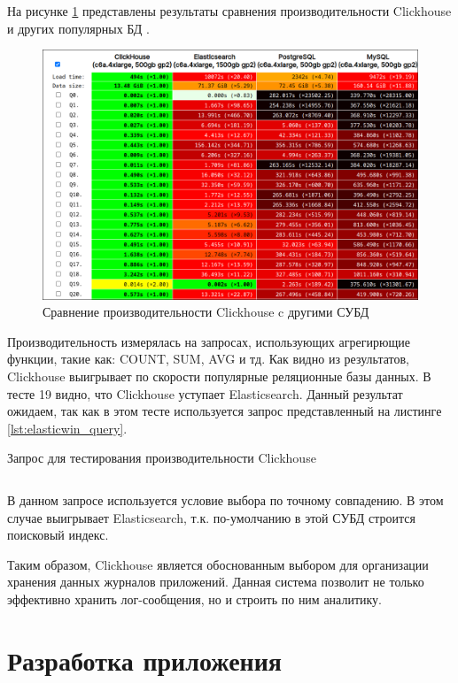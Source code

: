 \documentclass[14pt, russian]{scrartcl}
\begin{document}
На рисунке \ref{fig:clickbench} представлены результаты сравнения производительности Clickhouse и других популярных БД \cite{ClickBench}.


\begin{figure}[H]
	\centering
	\begin{minipage}[t]{.9\textwidth}
		\centering
		\includegraphics[width=.7\textwidth]{./imgs/clickbench.png}
	\end{minipage}
	\caption{Сравнение производительности Clickhouse c другими СУБД}
	\label{fig:clickbench}
\end{figure}

Производительность измерялась на запросах, использующих агрегирющие функции, такие как: COUNT, SUM, AVG и тд. Как видно из результатов, Clickhouse
выигрывает по скорости популярные реляционные базы данных. В тесте 19 видно, что Clickhouse уступает Elasticsearch. Данный результат ожидаем,
так как в этом тесте используется запрос представленный на листинге \ref{lst:elasticwin_query}. 

\begin{listing}[H]
	\caption{Запрос для тестирования производительности Clickhouse}
	\label{lst:elasticwin_query}
	\inputminted[style=bw, frame=single,fontsize = \footnotesize, linenos=false, xleftmargin = 1.5em]{SQL}{./listings/elastic_win.sql}
\end{listing}

В данном запросе используется условие выбора по точному совпадению. В этом случае выигрывает Elasticsearch,
т.к. по-умолчанию в этой СУБД строится поисковый индекс.

Таким образом, Clickhouse является обоснованным выбором для
организации хранения данных журналов приложений.
Данная система позволит не только эффективно хранить лог-сообщения, но и строить по ним 
аналитику.


\section{Разработка приложения}
\end{document}
